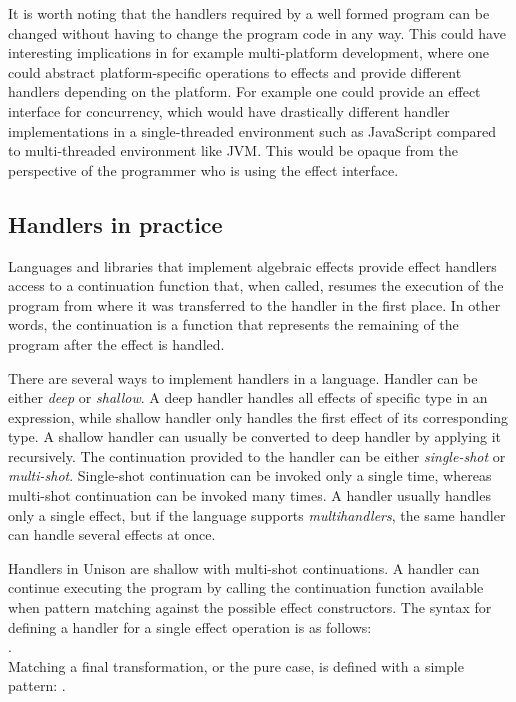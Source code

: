 It is worth noting that the handlers required by a well formed program can be changed without having to change the program code in any way. This could have interesting implications in for example multi-platform development, where one could abstract platform-specific operations to effects and provide different handlers depending on the platform. For example one could provide an effect interface for concurrency, which would have drastically different handler implementations in a single-threaded environment such as JavaScript compared to multi-threaded environment like JVM. This would be opaque from the perspective of the programmer who is using the effect interface.


\subsection{Handlers in practice}
Languages and libraries that implement algebraic effects provide effect handlers access to a continuation function that,  when called, resumes the execution of the program from where it was transferred to the handler in the first place. In other words, the continuation is a function that represents the remaining of the program after the effect is handled.

There are several ways to implement handlers in a language. Handler can be either \emph{deep} or \emph{shallow}. A deep handler handles all effects of specific type in an expression, while shallow handler only handles the first effect of its corresponding type. A shallow handler can usually be converted to deep handler by applying it recursively. The continuation provided to the handler can be either \emph{single-shot} or \emph{multi-shot}. Single-shot continuation can be invoked only a single time, whereas multi-shot continuation can be invoked many times. A handler usually handles only a single effect, but if the language supports \emph{multihandlers}, the same handler can handle several effects at once.

Handlers in Unison are shallow with multi-shot continuations. A handler can continue executing the program by calling the continuation function available when pattern matching against the possible effect constructors. The syntax for defining a handler for a single effect operation is as follows: \\.\\ Matching a final transformation, or the pure case, is defined with a simple pattern:
.

